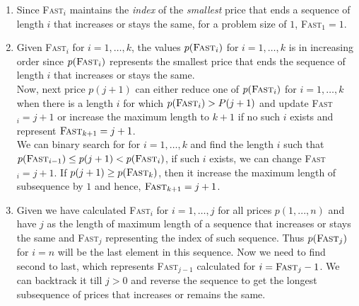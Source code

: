 \documentclass[11pt]{article}
\begin{document}
\newpage
\begin{enumerate}
    \item Since \textsc{Fast}$_i$ maintains the \emph{index} of the {\em smallest} price that ends a sequence of length $i$ that increases or stays the same, for a problem size of $1$, \textsc{Fast}$_1 = 1$.
    \item Given \textsc{Fast}$_i$ for $i=1,\ldots,k$, the values $p(\textsc{Fast}_i)$ for $i=1,\ldots,k$ is in increasing order since $p(\textsc{Fast}_i)$ represents the smallest price that ends the sequence of length $i$ that increases or stays the same. \\
    Now, next price $p(j+1)$ can either reduce one of $p(\textsc{Fast}_i)$ for $i=1,\ldots,k$ when there is a length $i$ for which $p(\textsc{Fast}_i) > P(j+1)$ and update \textsc{Fast}$_i = j+1$ or increase the maximum length to $k+1$ if no such $i$ exists and represent $\textsc{Fast}_{k+1} = j+1$.\\
    We can binary search for for $i=1,\ldots,k$ and find the length $i$ such that $p(\textsc{Fast}_{i-1}) \leq p(j+1) < p(\textsc{Fast}_i)$, if such $i$ exists, we can change \textsc{Fast}$_i = j+1$. If $p(j+1) \geq p(\textsc{Fast}_k)$, then it increase the maximum length of subsequence by $1$ and hence, $\textsc{Fast}_{k+1} = j+1$.
    \item Given we have calculated \textsc{Fast}$_i$ for $i=1,\ldots,j$ for all prices $p(1, ..., n)$ and have $j$ as the length of maximum length of a sequence that increases or stays the same and \textsc{Fast}$_j$ representing the index of such sequence. Thus $p(\textsc{Fast}_{j})$ for $i=n$ will be the last element in this sequence. Now we need to find second to last, which represents \textsc{Fast}$_{j-1}$ calculated for $i = \textsc{Fast}_{j}-1$. We can backtrack it till $j>0$ and reverse the sequence to get the longest subsequence of prices that increases or remains the same.
\end{enumerate}
\end{document}
